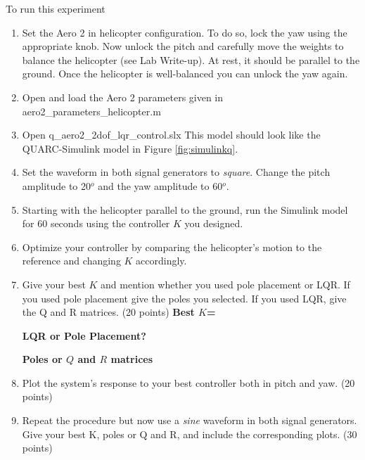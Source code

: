 \documentclass[11pt]{article}
\begin{document}
To run this experiment
\begin{enumerate}

\item Set the Aero 2 in helicopter configuration. To do so, lock the yaw using the appropriate knob. Now unlock the pitch and carefully move the weights to balance the helicopter (see Lab Write-up). At rest, it should be parallel to the ground. Once the helicopter is well-balanced you can unlock the yaw again.

  \item Open and load the Aero 2 parameters given in aero2\_parameters\_helicopter.m
    \item Open q\_aero2\_2dof\_lqr\_control.slx
       This model should look like the QUARC-Simulink model in Figure \ref{fig:simulinkq}.
         \item Set the waveform in both signal generators to \textit{square}. Change the pitch amplitude to 20$^o$ and the yaw amplitude to 60$^o$.

  \item Starting with the helicopter parallel to the ground, run the Simulink model for 60 seconds using the controller $K$ you designed.
    \item Optimize your controller by comparing the helicopter's motion to the reference and changing $K$ accordingly.
    \item Give your best $K$ and mention whether you used pole placement or LQR. If you used pole placement give the poles you selected. If you used LQR, give the Q and R matrices. (20 points) \vspace{0.5 cm}\textbf{Best \( K \)=}\\
\vspace{2cm} %

\textbf{LQR or Pole Placement?}\\

\vspace{1cm} %

\textbf{Poles or \( Q \) and \( R \) matrices\\}

\vspace{1cm} %


\newpage
    
    \item Plot the system's response to your best controller both in pitch and yaw. (20 points)
    \vspace{9 cm}
    
     \item Repeat the procedure but now use a \textit{sine} waveform in both signal generators. Give your best K, poles or Q and R, and include the corresponding plots. (30 points)

\newpage

    

    \vspace{7 cm}
    
    
\end{enumerate}
\end{document}
